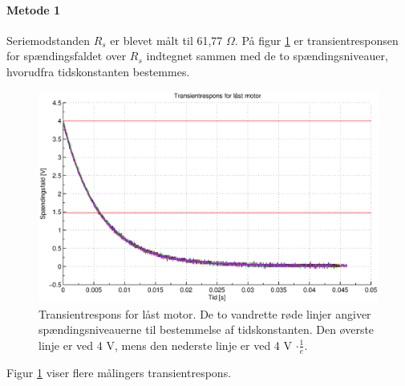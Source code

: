 \paragraph{Metode 1}
Seriemodstanden $R_s$ er blevet målt til 61,77 $\Omega$.
På figur \ref{fig:induktans0} er transientresponsen for spændingsfaldet over $R_s$ indtegnet
sammen med de to spændingsniveauer, hvorudfra tidskonstanten bestemmes.
\begin{figure}[th!]
	\centering
	\includegraphics[width=1\textwidth]{./graphics/induktans0.eps}
	\caption[Transientrespons for låst motor]
		{Transientrespons for låst motor. De to vandrette røde linjer angiver spændingsniveauerne til bestemmelse af tidskonstanten.
		Den øverste linje er ved 4 V, mens den nederste linje er ved 4 V $\cdot \frac{1}{e}$.}
	\label{fig:induktans0}
\end{figure}
Figur \ref{fig:induktans0} viser flere målingers transientrespons.
